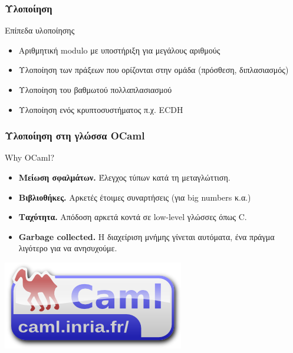 \documentclass{beamer}
\begin{document}
%
\begin{frame}
\frametitle{Υλοποίηση}
\begin{block}
{Επίπεδα υλοποίησης}
\begin{itemize}
\item Αριθμητική modulo με υποστήριξη για μεγάλους αριθμούς
\item Υλοποίηση των πράξεων που ορίζονται στην ομάδα (πρόσθεση, διπλασιασμός)
\item Υλοποίηση του βαθμωτού πολλαπλασιασμού
\item Υλοποίηση ενός κρυπτοσυστήματος π.χ. ECDH 
\end{itemize}
\end{block}
\end{frame}

%
\begin{frame}
\frametitle{Υλοποίηση στη γλώσσα OCaml}
\begin{block}
{Why OCaml?}
\begin{itemize}
\item \textbf{Μείωση σφαλμάτων.} Έλεγχος τύπων κατά τη μεταγλώττιση.
\item \textbf{Βιβλιοθήκες.} Αρκετές έτοιμες συναρτήσεις (για big numbers κ.α.)
\item \textbf{Ταχύτητα.} Απόδοση αρκετά κοντά σε low-level γλώσσες όπως C.
\item \textbf{Garbage collected.} Η διαχείριση μνήμης γίνεται αυτόματα, ένα πράγμα λιγότερο για να ανησυχούμε.
\end{itemize}
\end{block}
\begin{flushright}
\includegraphics[scale=0.7]{ocaml_logo.png}
\end{flushright}
\end{frame}
\end{document}
